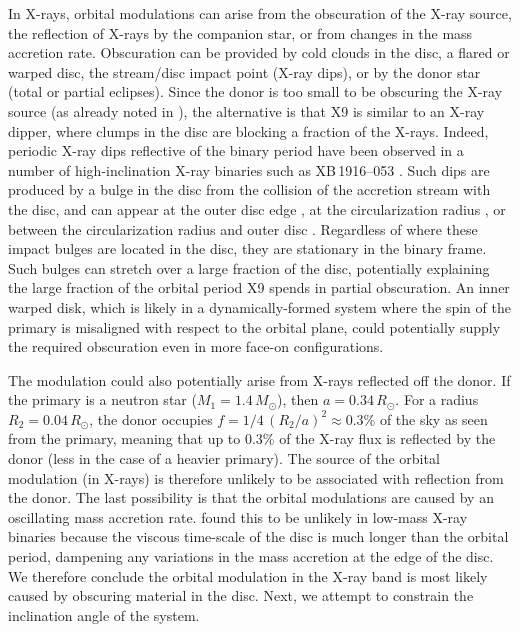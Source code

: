 \documentclass[a4paper,fleqn,usenatbib]{mnras}
\begin{document}
In X-rays, orbital modulations can arise from the obscuration of the X-ray source, the reflection of X-rays by the companion star, or from changes in the mass accretion rate. Obscuration can be provided by cold clouds in the disc, a flared or warped disc, the stream/disc impact point (X-ray dips), or by the donor star (total or partial eclipses). Since the donor is too small to be obscuring the X-ray source (as already noted in \citealp{2017MNRAS.467.2199B}), the alternative is that X9 is similar to an X-ray dipper, where clumps in the disc are blocking a fraction of the X-rays. Indeed, periodic X-ray dips reflective of the binary period have been observed in a number of high-inclination X-ray binaries such as XB\,1916--053 \citep{1982ApJ...253L..61W}. Such dips are produced by a bulge in the disc from the collision of the accretion stream with the disc, and can appear at the outer disc edge \citep{1982ApJ...257..318W}, at the circularization radius \citep{1987A&A...178..137F}, or between the circularization radius and outer disc \citep{1996ApJ...470.1024A}. Regardless of where these impact bulges are located in the disc, they are stationary in the binary frame. Such bulges can stretch over a large fraction of the disc, potentially explaining the large fraction of the orbital period X9 spends in partial obscuration. An inner warped disk, which is likely in a dynamically-formed system where the spin of the primary is misaligned with respect to the orbital plane, could potentially supply the required obscuration even in more face-on configurations.

The modulation could also potentially arise from X-rays reflected off the donor. If the primary is a neutron star ($M_1 = 1.4\,M_\odot$), then $a = 0.34\,R_\odot$. For a radius $R_2 = 0.04\,R_\odot$, the donor occupies $f = 1/4 \, (R_2/a)^2 \approx 0.3$\% of the sky as seen from the primary, meaning that up to 0.3\% of the X-ray flux is reflected by the donor (less in the case of a heavier primary). The source of the orbital modulation (in X-rays) is therefore unlikely to be associated with reflection from the donor. The last possibility is that the orbital modulations are caused by an oscillating mass accretion rate. \citet{2009MNRAS.399.1633Z} found this to be unlikely in low-mass X-ray binaries because the viscous time-scale of the disc is much longer than the orbital period, dampening any variations in the mass accretion at the edge of the disc. We therefore conclude the orbital modulation in the X-ray band is most likely caused by obscuring material in the disc. Next, we attempt to constrain the inclination angle of the system.
\end{document}
